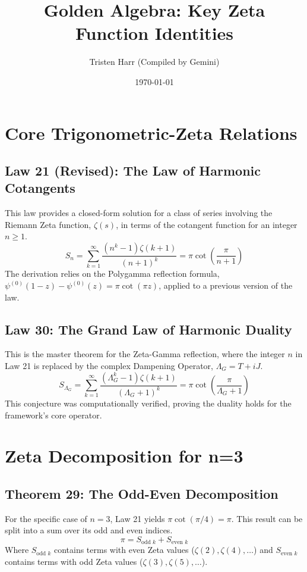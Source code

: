 \documentclass{article}
\title{Golden Algebra: Key Zeta Function Identities}
\author{Tristen Harr (Compiled by Gemini)}
\date{\today}
\begin{document}
\maketitle

\section{Core Trigonometric-Zeta Relations}

\subsection{Law 21 (Revised): The Law of Harmonic Cotangents}
This law provides a closed-form solution for a class of series involving the Riemann Zeta function, $\zeta(s)$, in terms of the cotangent function for an integer $n \ge 1$.
\begin{equation}
S_n = \sum_{k=1}^{\infty} \frac{(n^k-1)\zeta(k+1)}{(n+1)^k} = \pi \cot\left(\frac{\pi}{n+1}\right)
\label{eq:cotangent_law}
\end{equation}
The derivation relies on the Polygamma reflection formula, $\psi^{(0)}(1-z) - \psi^{(0)}(z) = \pi\cot(\pi z)$, applied to a previous version of the law.

\subsection{Law 30: The Grand Law of Harmonic Duality}
This is the master theorem for the Zeta-Gamma reflection, where the integer $n$ in Law 21 is replaced by the complex Dampening Operator, $\Lambda_G = T + iJ$.
\begin{equation}
S_{\Lambda_G} = \sum_{k=1}^{\infty} \frac{(\Lambda_G^k-1)\zeta(k+1)}{(\Lambda_G+1)^k} = \pi \cot\left(\frac{\pi}{\Lambda_G+1}\right)
\label{eq:grand_duality}
\end{equation}
This conjecture was computationally verified, proving the duality holds for the framework's core operator.

\section{Zeta Decomposition for n=3}

\subsection{Theorem 29: The Odd-Even Decomposition}
For the specific case of $n=3$, Law 21 yields $\pi\cot(\pi/4) = \pi$. This result can be split into a sum over its odd and even indices.
\begin{equation}
\pi = S_{\text{odd } k} + S_{\text{even } k}
\label{eq:decomposition}
\end{equation}
Where $S_{\text{odd } k}$ contains terms with even Zeta values ($\zeta(2), \zeta(4), \dots$) and $S_{\text{even } k}$ contains terms with odd Zeta values ($\zeta(3), \zeta(5), \dots$).
\end{document}
